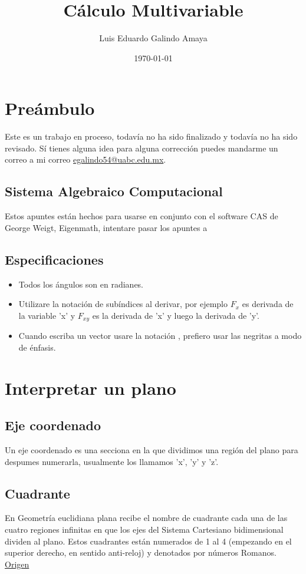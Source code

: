 \documentclass{article}
\author{Luis Eduardo Galindo Amaya}
\date{\today}
\title{Cálculo Multivariable}
\begin{document}
\maketitle
\tableofcontents


\section{Preámbulo}
\label{sec:org4747500}
Este es un trabajo en proceso, todavía no ha sido finalizado y todavía no ha sido revisado. Sí tienes alguna idea para alguna corrección puedes mandarme un correo a mi correo \href{mailto:egalindo54@uabc.edu.mx}{egalindo54@uabc.edu.mx}.

\subsection{Sistema Algebraico Computacional}
\label{sec:org87e1cf5}
Estos apuntes están hechos para usarse en conjunto con el software CAS de George Weigt, Eigenmath, intentare pasar los apuntes a 

\subsection{Especificaciones}
\label{sec:org4c2516d}
\begin{itemize}
\item Todos los ángulos son en radianes.
\item Utilizare la notación de subíndices al derivar, por ejemplo \(F_x\) es derivada de la variable 'x' y \(F_{xy}\) es la derivada de 'x' y luego la derivada de 'y'.
\item Cuando escriba un vector usare la notación , prefiero usar las negritas a modo de énfasis.
\end{itemize}


\section{Interpretar un plano}
\label{sec:orgcd17676}
\subsection{Eje coordenado}
\label{sec:org3c6d085}
Un eje coordenado es una secciona en la que dividimos una región del plano para despumes numerarla, usualmente los llamamos 'x', 'y' y 'z'.

\subsection{Cuadrante}
\label{sec:orgbf6189a}
En Geometría euclidiana plana recibe el nombre de cuadrante cada una de las cuatro regiones infinitas en que los ejes del Sistema Cartesiano bidimensional dividen al plano. Estos cuadrantes están numerados de 1 al 4 (empezando en el superior derecho, en sentido anti-reloj) y denotados por números Romanos. \href{https://es.wikipedia.org/wiki/Cuadrante\_(geometr\%C3\%ADa)}{Origen}
\end{document}
